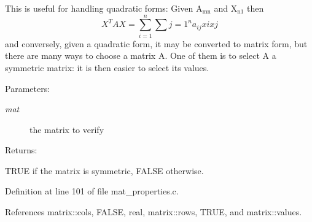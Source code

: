 This is useful for handling quadratic forms: Given A$_{\mbox{mn}}$ and X$_{\mbox{n1}}$ then \[ X^T A X = \sum_{i=1}^n \sum{j=1}^n a_{ij} x{i} x{j} \] and conversely, given a quadratic form, it may be converted to matrix form, but there are many ways to choose a matrix A. One of them is to select A a symmetric matrix: it is then easier to select its values.\begin{Desc}
\item[Parameters: ]\par
\begin{description}
\item[{\em 
mat}]the matrix to verify\end{description}
\end{Desc}
\begin{Desc}
\item[Returns: ]\par
TRUE if the matrix is symmetric, FALSE otherwise. \end{Desc}


Definition at line 101 of file mat\_\-properties.c.

References matrix::cols, FALSE, real, matrix::rows, TRUE, and matrix::values.